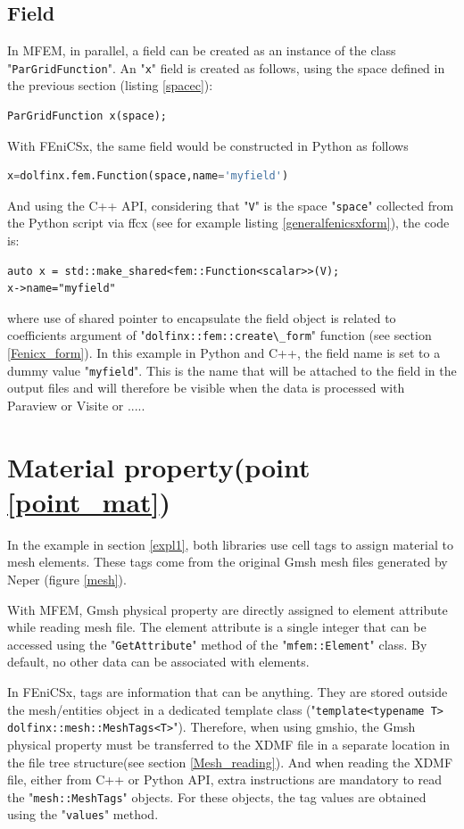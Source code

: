 \documentclass[12pt]{article}
\newcommand{\f}[1]{FEniCSx#1}
\newcommand{\mycode}[1]{\textsf{"}\lstinline`#1`\textsf{"}}
\newcommand{\mycodepy}[1]{\textsf{"}\lstinline[language=Python]`#1`\textsf{"}}
\begin{document}
\subsection{Field}
In MFEM, in parallel, a field can be created as an instance of the class \mycode{ParGridFunction}. An \mycode{x} field is created as follows, using the space defined in the previous section (listing \ref{spacec}):
\begin{lstlisting}[numbers=none,basicstyle=\footnotesize,label=xfield]
	ParGridFunction x(space);
\end{lstlisting}

With \f{}, the same field would be constructed in Python as follows
\begin{lstlisting}[numbers=none,basicstyle=\footnotesize,language=Python,label=pyx]
x=dolfinx.fem.Function(space,name='myfield')
\end{lstlisting}
And using the C++ API, considering that \mycode{V} is the space \mycodepy{space} collected from the Python script via ffcx (see for example listing \ref{generalfenicsxform}), the code is:
\begin{lstlisting}[numbers=none,basicstyle=\footnotesize,label=fieldfenics]
auto x = std::make_shared<fem::Function<scalar>>(V);
x->name="myfield"
\end{lstlisting}
where use of shared pointer to encapsulate the field object is related to coefficients argument of \mycode{dolfinx::fem::create\_form} function (see section \ref{Fenicx_form}). In this example in Python and C++, the field name is set to a dummy value \mycode{myfield}.
This is the name that will be attached to the field in the output files and will therefore be visible when the data is processed with Paraview or Visite or .....
\section{Material property(point \ref{point_mat})\label{MatProp}}
In the example in section \ref{expl1}, both libraries use cell tags to assign material to mesh elements. 
These tags come from the original Gmsh mesh files generated by Neper (figure \ref{mesh}).

With MFEM, Gmsh physical property are directly assigned to element attribute while reading mesh file. 
The element attribute is a single integer that can be accessed using the \mycode{GetAttribute} method of the \mycode{mfem::Element} class.
By default, no other data can be associated with elements.

In \f{}, tags are information that can be anything. They are stored outside the mesh/entities object in a dedicated template class (\mycode{template<typename T> dolfinx::mesh::MeshTags<T>}).
Therefore, when using gmshio, the Gmsh physical property must be transferred to the XDMF file in a separate location in the file tree structure(see section \ref{Mesh_reading}).
And when reading the XDMF file, either from C++ or Python API, extra instructions are mandatory to read the \mycode{mesh::MeshTags} objects. For these objects, the tag values are obtained using the \mycode{values} method.
\end{document}
